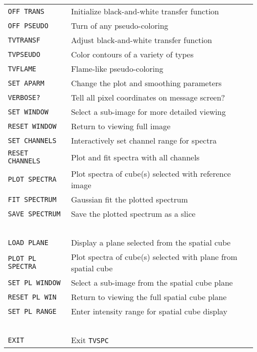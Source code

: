 \documentclass[twoside]{article}
\newcommand{\Hi}[1]{\textcolor{hicol}{#1}}
\begin{document}
\begin{center}
\begin{tabular}{|l|l|}\hline
 {\tt OFF TRANS      } & Initialize black-and-white transfer function \\
 {\tt OFF PSEUDO     } & Turn of any pseudo-coloring \\
 {\tt TVTRANSF       } & Adjust black-and-white transfer function \\
 {\tt TVPSEUDO       } & Color contours of a variety of types \\
 {\tt TVFLAME        } & Flame-like pseudo-coloring \\
 {\tt SET APARM      } & Change the plot and smoothing parameters \\
 {\tt VERBOSE?       } & Tell all pixel coordinates on message screen? \\
 {\tt SET WINDOW     } & Select a sub-image for more detailed viewing \\
 {\tt RESET WINDOW   } & Return to viewing full image \\
 {\tt SET CHANNELS   } & Interactively set channel range for spectra \\
 {\tt RESET CHANNELS } & Plot and fit spectra with all channels \\
 {\tt PLOT SPECTRA   } & Plot spectra of cube(s) selected with
                         reference image  \\
 {\tt FIT SPECTRUM   } & Gaussian fit the plotted spectrum \\
 {\tt SAVE SPECTRUM  } & Save the plotted spectrum as a slice \\
 {\                  } & \\
\Hi{{\tt LOAD PLANE }} & \Hi{Display a plane selected from the spatial
                         cube} \\
\Hi{{\tt PLOT PL SPECTRA}}&\Hi{Plot spectra of cube(s) selected with
                         plane from spatial cube}\\
\Hi{{\tt SET PL WINDOW}}  &\Hi{Select a sub-image from the spatial
                           cube plane} \\
\Hi{\tt{RESET PL WIN}} &\Hi{Return to viewing the full spatial cube
                         plane}\\
\Hi{{\tt SET PL RANGE}}&\Hi{Enter intensity range for spatial cube
                         display}\\
 {\                  } & \\
 {\tt EXIT           } & Exit {\tt TVSPC}\\ \hline
\end{tabular}
\end{center}
\end{document}
